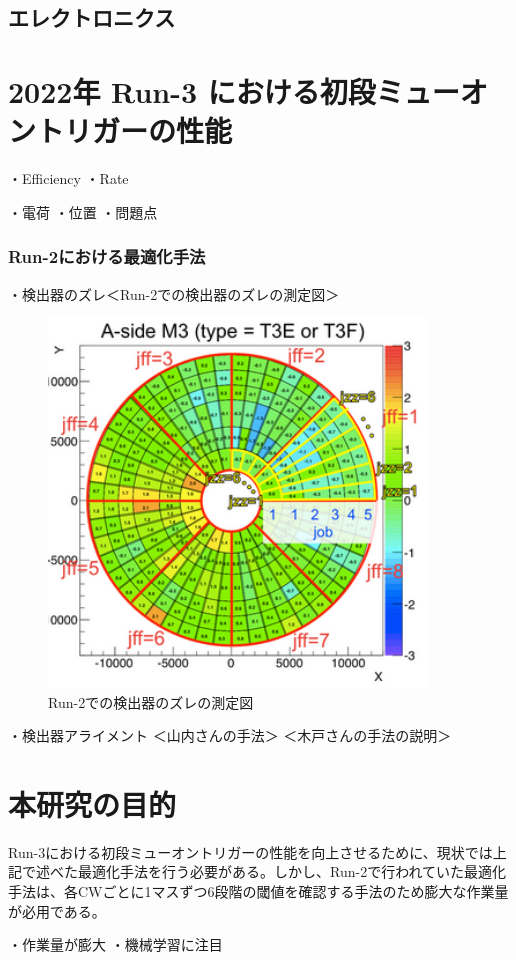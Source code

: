 \subsection{エレクトロニクス}

\section{2022年 Run-3 における初段ミューオントリガーの性能}
・Efficiency
・Rate

・電荷
・位置
・問題点


\subsubsection{Run-2における最適化手法}
・検出器のズレ＜Run-2での検出器のズレの測定図＞
\begin{figure}[tb]
  \centering
  \includegraphics[clip, width=10cm]{fig/4/zure.png}
  \caption{Run-2での検出器のズレの測定図}
  \label{fig:Resolution}
\end{figure}
・検出器アライメント
＜山内さんの手法＞
＜木戸さんの手法の説明＞


\section{本研究の目的}


Run-3における初段ミューオントリガーの性能を向上させるために、現状では上記で述べた最適化手法を行う必要がある。しかし、Run-2で行われていた最適化手法は、各CWごとに1マスずつ6段階の閾値を確認する手法のため膨大な作業量が必用である。

・作業量が膨大
・機械学習に注目















